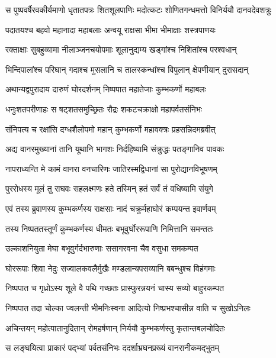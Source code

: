 \twolineshloka
{स पुष्पवर्षैरवकीर्यमाणो धृतातपत्रः शितशूलपाणिः}
{मदोत्कटः शोणितगन्धमत्तो विनिर्ययौ दानवदेवशत्रुः} %

\twolineshloka
{पदातयश्च बहवो महानादा महाबलाः}
{अन्वयू राक्षसा भीमा भीमाक्षाः शस्त्रपाणयः} %

\twolineshloka
{रक्ताक्षाः सुबहुव्यामा नीलाञ्जनचयोपमाः}
{शूलानुद्यम्य खड्गांश्च निशितांश्च परश्वधान्} %

\twolineshloka
{भिन्दिपालांश्च परिघान् गदाश्च मुसलानि च}
{तालस्कन्धांश्च विपुलान् क्षेपणीयान् दुरासदान्} %

\twolineshloka
{अथान्यद्वपुरादाय दारुणं घोरदर्शनम्}
{निष्पपात महातेजाः कुम्भकर्णो महाबलः} %

\twolineshloka
{धनुःशतपरीणाहः स षट्शतसमुच्छ्रितः}
{रौद्रः शकटचक्राक्षो महापर्वतसंनिभः} %

\twolineshloka
{संनिपत्य च रक्षांसि दग्धशैलोपमो महान्}
{कुम्भकर्णो महावक्त्रः प्रहसन्निदमब्रवीत्} %

\twolineshloka
{अद्य वानरमुख्यानां तानि यूथानि भागशः}
{निर्दहिष्यामि संक्रुद्धः पतङ्गानिव पावकः} %

\twolineshloka
{नापराध्यन्ति मे कामं वानरा वनचारिणः}
{जातिरस्मद्विधानां सा पुरोद्यानविभूषणम्} %

\twolineshloka
{पुररोधस्य मूलं तु राघवः सहलक्ष्मणः}
{हते तस्मिन् हतं सर्वं तं वधिष्यामि संयुगे} %

\twolineshloka
{एवं तस्य ब्रुवाणस्य कुम्भकर्णस्य राक्षसाः}
{नादं चक्रुर्महाघोरं कम्पयन्त इवार्णवम्} %

\twolineshloka
{तस्य निष्पततस्तूर्णं कुम्भकर्णस्य धीमतः}
{बभूवुर्घोररूपाणि निमित्तानि समन्ततः} %

\twolineshloka
{उल्काशनियुता मेघा बभूवुर्गर्दभारुणाः}
{ससागरवना चैव वसुधा समकम्पत} %

\twolineshloka
{घोररूपाः शिवा नेदुः सज्वालकवलैर्मुखैः}
{मण्डलान्यपसव्यानि बबन्धुश्च विहंगमाः} %

\twolineshloka
{निष्पपात च गृध्रोऽस्य शूले वै पथि गच्छतः}
{प्रास्फुरन्नयनं चास्य सव्यो बाहुरकम्पत} %

\twolineshloka
{निष्पपात तदा चोल्का ज्वलन्ती भीमनिःस्वना}
{आदित्यो निष्प्रभश्चासीन्न वाति च सुखोऽनिलः} %

\twolineshloka
{अचिन्तयन् महोत्पातानुदितान् रोमहर्षणान्}
{निर्ययौ कुम्भकर्णस्तु कृतान्तबलचोदितः} %

\twolineshloka
{स लङ्घयित्वा प्राकारं पद्भ्यां पर्वतसंनिभः}
{ददर्शाभ्रघनप्रख्यं वानरानीकमद्भुतम्} %

